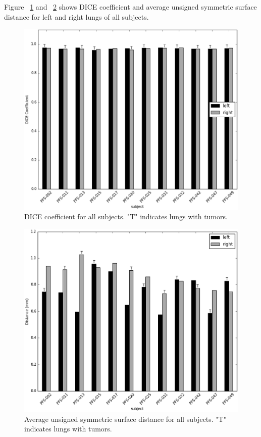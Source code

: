\documentclass{llncs}
\begin{document}
Figure ~\ref{fig:dice} and ~\ref{fig:dist} shows DICE coefficient and average unsigned symmetric surface distance for left and right lungs of all subjects.
\begin{figure}[t]
  \centering
    \includegraphics[width=4.5in]{figs/dice}
  \caption{DICE coefficient for all subjects. "T" indicates lungs with tumors.}
  \label{fig:dice}
\end{figure}

\begin{figure}[t]
  \centering
    \includegraphics[width=4.5in]{figs/distUnsignSym}
  \caption{Average unsigned symmetric surface distance for all subjects. "T" indicates lungs with tumors.}
  \label{fig:dist}
\end{figure}
\end{document}
